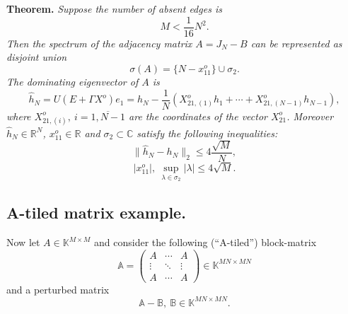 \documentclass[a4paper]{jpconf}
\begin{document}
\begin{center}
\textbf{Theorem.}
{\it
    Suppose the number of absent edges is
    \[ M < \frac{1}{16} N^2. \]
    Then the spectrum of the adjacency matrix \( A = J_N - B \)
        can be represented as disjoint union
    \[
        \sigma(A) = \{ N - x_{11}^o \} \cup \sigma_2.
    \]
    The dominating eigenvector of \( A \) is
    \[
        \hat{h}_N = U(E+\Gamma X^o) e_1 =
            h_N - \frac1N (X_{21,(1)}^o h_1 + \cdots + X_{21, (N{-}1)}^o h_{N{-}1}),
    \]
    where \( X_{21,(i)}^o,\ i=\overline{1,N{-}1} \) are the coordinates
    of the vector \( X_{21}^o \).
    Moreover \( \hat{h}_N\in\mathbb{R}^{N} \),
    \( x_{11}^o\in\mathbb{R} \) and \( \sigma_2\subset\mathbb{C} \)
    satisfy the following inequalities:
    \[
        \|\hat{h}_N - h_N\|_2 \leq 4\frac{\sqrt{M}}{N},
    \]
    \[
        \lvert x_{11}^o \rvert,
        \ \sup_{\lambda\in\sigma_2} \lvert\lambda\rvert \leq 4\sqrt{M}.
    \]
}
\end{center}

\subsection*{A-tiled matrix example.}

Now let \( A\in\mathbb{K}^{M{\times}M} \)
    and consider the following (``A-tiled'') block-matrix
    \[
        \mathbb{A} =
        \begin{pmatrix}
            A & \cdots & A \\
            \vdots & \ddots & \vdots \\
            A & \cdots & A
        \end{pmatrix}
        \in\mathbb{K}^{{MN}{\times}{MN}}
    \]
    and a perturbed matrix
    \[
        \mathbb{A} - \mathbb{B},\ \mathbb{B}\in\mathbb{K}^{{MN}{\times}{MN}}.
    \]
\end{document}
